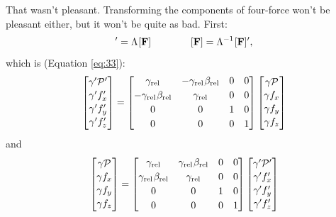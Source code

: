 \documentclass[12pt]{article}
\renewcommand{\vv}[1]{\mathbf{#1}}
\begin{document}
That wasn't pleasant. Transforming the components of four-force won't be pleasant either, but it won't be quite as bad. First:
\begin{equation*}
[\vv F]^\prime = \Lambda \mkern1mu [\vv F] \qquad \qquad [\vv F] = \Lambda^{-1} \mkern1mu [\vv F]^\prime ,
\end{equation*}
which is (Equation \ref{eq:33}):
\begin{equation*}
\begin{bmatrix}
\gamma^\prime \mathcal{P}^\prime \\[.15 em]
\gamma^\prime f_x^\prime \\[.15 em]
\gamma^\prime f_y^\prime \\[.15 em]
\gamma^\prime f_z^\prime\\[.1 em]
\end{bmatrix}
=
\begin{bmatrix}
\gamma_{\textrm{rel}} & -\gamma_{\textrm{rel}} \mkern1mu \beta_{\textrm{rel}} & 0 & 0 \\[.25 em]
- \gamma_{\textrm{rel}} \mkern1mu \beta_{\textrm{rel}} & \gamma_{\textrm{rel}} & 0 & 0 \\[.25 em]
0 & 0 & 1 & 0 \\[.25 em]
0 & 0 & 0 & 1
\end{bmatrix}
\begin{bmatrix}
\gamma \mathcal{P} \\[.15 em]
\gamma f_x \\[.15 em]
\gamma f_y \\[.15 em]
\gamma f_z \\[.1 em]
\end{bmatrix}
\end{equation*}
and
\begin{equation*}
\begin{bmatrix}
\gamma \mathcal{P} \\[.15 em]
\gamma f_x \\[.15 em]
\gamma f_y \\[.15 em]
\gamma f_z \\[.1 em]
\end{bmatrix}
=
\begin{bmatrix}
\gamma_{\textrm{rel}} & \gamma_{\textrm{rel}} \mkern1mu \beta_{\textrm{rel}} & 0 & 0 \\[.25 em]
\gamma_{\textrm{rel}} \mkern1mu \beta_{\textrm{rel}} & \gamma_{\textrm{rel}} & 0 & 0 \\[.25 em]
0 & 0 & 1 & 0 \\[.25 em]
0 & 0 & 0 & 1
\end{bmatrix}
\begin{bmatrix}
\gamma^\prime \mathcal{P}^\prime \\[.15 em]
\gamma^\prime f_x^\prime \\[.15 em]
\gamma^\prime f_y^\prime \\[.15 em]
\gamma^\prime f_z^\prime\\[.1 em]
\end{bmatrix}
\end{equation*}
\end{document}
